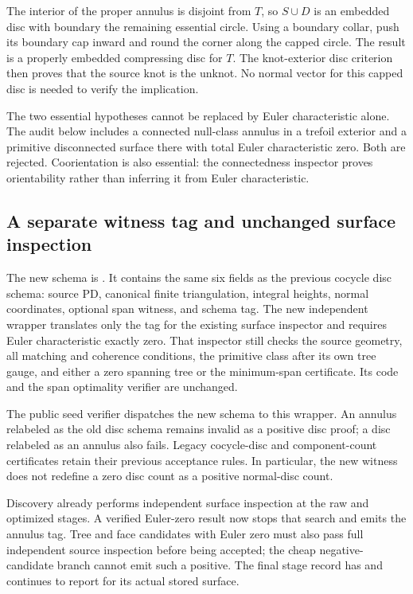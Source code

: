 The interior of the proper annulus is disjoint from $T$, so $S\cup D$
is an embedded disc with boundary the remaining essential circle. Using
a boundary collar, push its boundary cap inward and round the corner
along the capped circle. The result is a properly embedded compressing
disc for $T$. The knot-exterior disc criterion then proves that the source
knot is the unknot. No normal vector for this capped disc is needed to
verify the implication.

The two essential hypotheses cannot be replaced by Euler characteristic
alone. The audit below includes a connected null-class annulus in a trefoil
exterior and a primitive disconnected surface there with total Euler
characteristic zero. Both are rejected. Coorientation is also essential:
the connectedness inspector proves orientability rather than inferring it
from Euler characteristic.

\subsection{A separate witness tag and unchanged surface inspection}

The new schema is . It contains the same
six fields as the previous cocycle disc schema: source PD, canonical finite
triangulation, integral heights, normal coordinates, optional span witness,
and schema tag. The new independent wrapper translates only the tag for
the existing surface inspector and requires Euler characteristic exactly
zero. That inspector still checks the source geometry, all matching and
coherence conditions, the primitive class after its own tree gauge, and
either a zero spanning tree or the minimum-span certificate. Its code and
the span optimality verifier are unchanged.

The public seed verifier dispatches the new schema to this wrapper.
An annulus relabeled as the old disc schema remains invalid as a positive
disc proof; a disc relabeled as an annulus also fails. Legacy cocycle-disc
and component-count certificates retain their previous acceptance rules.
In particular, the new witness does not redefine a zero disc count as a
positive normal-disc count.

Discovery already performs independent surface inspection at the raw and
optimized stages. A verified Euler-zero result now stops that search and
emits the annulus tag. Tree and face candidates with Euler zero must also
pass full independent source inspection before being accepted; the cheap
negative-candidate branch cannot emit such a positive. The final stage
record has  and continues to report
 for its actual stored surface.

